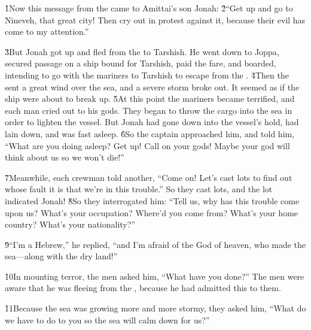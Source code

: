 


\v{1}Now this message from the  came to Amittai's son Jonah: \v{2}``Get up and go to Nineveh, that great city! Then cry out in protest against it, because their evil has come to my attention.''

\v{3}But Jonah got up and fled from the  to Tarshish. He went down to Joppa, secured passage on a ship bound for Tarshish, paid the fare, and boarded, intending to go with the mariners to Tarshish to escape from the . \v{4}Then the  sent a great wind over the sea, and a severe storm broke out. It seemed as if the ship were about to break up. \v{5}At this point the mariners became terrified, and each man cried out to his gods. They began to throw the cargo into the sea in order to lighten the vessel. But Jonah had gone down into the vessel's hold, had lain down, and was fast asleep. \v{6}So the captain approached him, and told him, ``What are you doing asleep? Get up! Call on your gods! Maybe your god will think about us so we won't die!''

\v{7}Meanwhile, each crewman told another, ``Come on! Let's cast lots to find out whose fault it is that we're in this trouble.'' So they cast lots, and the lot indicated Jonah! \v{8}So they interrogated him: ``Tell us, why has this trouble come upon us? What's your occupation? Where'd you come from? What's your home country? What's your nationality?''

\v{9}``I'm a Hebrew,'' he replied, ``and I'm afraid of the  God of heaven, who made the sea---along with the dry land!''

\v{10}In mounting terror, the men asked him, ``What have you done?'' The men were aware that he was fleeing from the , because he had admitted this to them.

\v{11}Because the sea was growing more and more stormy, they asked him, ``What do we have to do to you so the sea will calm down for us?''

